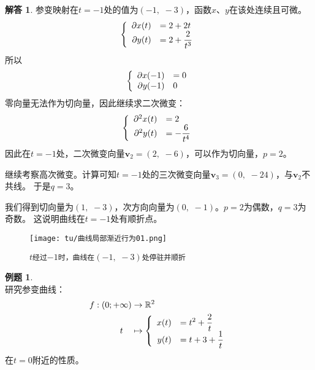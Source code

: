 \documentclass[12pt,UTF8]{ctexbook}
\theoremstyle{definition}
\newtheorem{et}{例题}[section]
\newtheorem*{so}{解答}
\theoremstyle{plain}
\begin{document}
\begin{so}
    参变映射在$t=-1$处的值为$(-1, \,\,-3)$，函数$x$、$y$在该处连续且可微。
    $$
    \left\{
        \begin{array}[]{rl}
            \partial x(t) &=2 + 2t \\
            \partial y(t) &\displaystyle = 2 + \frac{2}{t^3}\\
        \end{array}
    \right.
    $$
    所以
    $$
    \left\{
        \begin{array}[]{rl}
            \partial x(-1) &= 0 \\
            \partial y(-1) & 0\\
        \end{array}
    \right.
    $$
    零向量无法作为切向量，因此继续求二次微变：
    $$
    \left\{
        \begin{array}[]{rl}
            \partial^2 x(t) &=2 \\
            \partial^2 y(t) &\displaystyle = - \frac{6}{t^4}\\
        \end{array}
    \right.
    $$
    因此在$t=-1$处，二次微变向量$\mathbf{v}_2 = (2, \,\,-6)$，可以作为切向量，$p=2$。

    继续考察高次微变。计算可知$t=-1$处的三次微变向量$\mathbf{v}_3 = (0, \,\,-24)$，与$\mathbf{v}_2$不共线。
    于是$q=3$。
    
    我们得到切向量为$(1,\,\,-3)$，次方向向量为$(0,\,\,-1)$。$p=2$为偶数，$q=3$为奇数。
    这说明曲线在$t=-1$处有顺折点。
\end{so}

\begin{figure}[h] 
    \centering
    \texttt{[image: tu/曲线局部渐近行为01.png]}
    \caption*{\texttt{$t$经过$-1$时，曲线在$(-1, \,\,-3)$处停驻并顺折}}
\end{figure}

\begin{et}
    \mbox{} \\
    研究参变曲线：%
    \begin{align*}
        f: (0;+\infty) &\rightarrow \mathbb{R}^2 \\
        t\quad &\mapsto\left\{
            \begin{array}[]{rl}
                x(t) &\displaystyle = t^2 + \frac{2}{t} \\
                y(t) &\displaystyle = t + 3 + \frac{1}{t}\\
            \end{array}
        \right.
    \end{align*}
    在$t=0$附近的性质。
\end{et}
\end{document}
